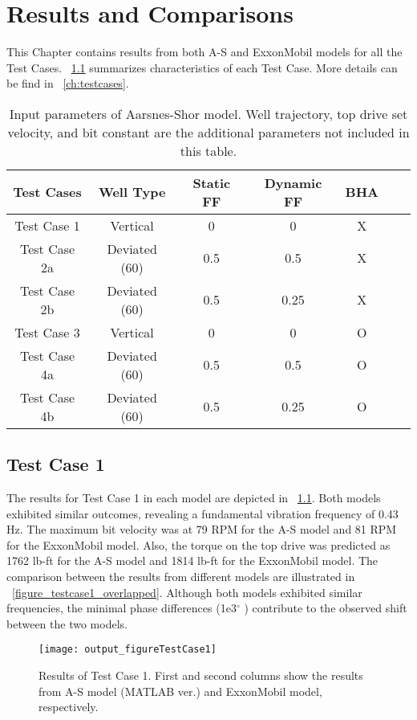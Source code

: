 \chapter{Results and Comparisons} 
\label{ch:results} 
This Chapter contains results from both A-S and ExxonMobil models for all the Test Cases. \tablename~\ref{Test_case_summary} summarizes characteristics of each Test Case. More details can be find in \chaptername~\ref{ch:testcases}.

\begin{table}
    \centering
    \begin{tabular}{|c|c|c|c|c|c|c|}
        \hline
        \textbf{Test Cases} & \textbf{Well Type} & \textbf{Static FF} & \textbf{Dynamic FF}& \textbf{BHA}\\
        \hline
        Test Case 1 & Vertical & 0 & 0 & X\\
        \hline
        Test Case 2a & Deviated (60\textdegree{}) & 0.5 & 0.5 & X \\
        \hline
        Test Case 2b & Deviated (60\textdegree{}) & 0.5 & 0.25 & X \\
        \hline
        Test Case 3 & Vertical & 0 & 0 & O\\                                                
        \hline
        Test Case 4a & Deviated (60\textdegree{}) & 0.5 & 0.5 & O \\                                                  
        \hline
        Test Case 4b & Deviated (60\textdegree{}) & 0.5 & 0.25 & O \\                                                     
        \hline
    \end{tabular}
    \caption[Input parameters of Aarsnes-Shor model (Python ver.)]{Input parameters of Aarsnes-Shor model. Well trajectory, top drive set velocity, and bit constant are the additional parameters not included in this table.}
    \label{Test_case_summary}
\end{table} 

 
\section{Test Case 1}
The results for Test Case 1 in each model are depicted in \figurename~\ref{figure_testcase1}. Both models exhibited similar outcomes, revealing a fundamental vibration frequency of 0.43 Hz. The maximum bit velocity was at 79 RPM for the A-S model and 81 RPM for the ExxonMobil model. Also, the torque on the top drive was predicted as 1762 lb-ft for the A-S model and 1814 lb-ft for the ExxonMobil model. The comparison between the results from different models are illustrated in \figurename~\ref{figure_testcase1_overlapped}. Although both models exhibited similar frequencies, the minimal phase differences (1e3$^{\circ}$ ) contribute to the observed shift between the two models.
\begin{figure}
  \centering
  \texttt{[image: output\_figureTestCase1]}
  \caption[Results of Test Case 1]{Results of Test Case 1. First and second columns show the results from A-S model (MATLAB ver.) and ExxonMobil model, respectively.}\label{figure_testcase1}
\end{figure}

